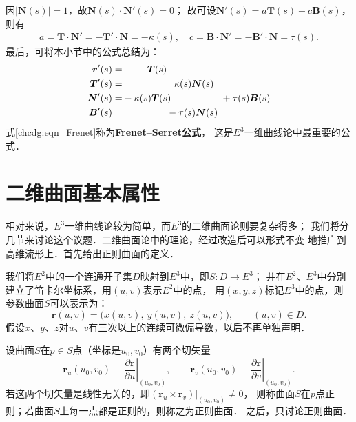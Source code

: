 因$|\boldsymbol{N}(s)|=1$，故$\boldsymbol{N}(s) \cdot \boldsymbol{N}'(s)=0$；
故可设$\boldsymbol{N}'(s)=a \boldsymbol{T}(s) + c \boldsymbol{B}(s)$，则有
\begin{align*}
    a = \boldsymbol{T} \cdot \boldsymbol{N}' = -\boldsymbol{T}' \cdot \boldsymbol{N} = - \kappa(s), \quad
    c = \boldsymbol{B} \cdot \boldsymbol{N}' = -\boldsymbol{B}' \cdot \boldsymbol{N} = \tau(s). 
\end{align*}
最后，可将本小节中的公式总结为：
\begin{subequations}\label{chcdg:eqn_Frenet}
    \begin{align}
        \boldsymbol{r}'(s) =& \hphantom{-\kappa(s)} \boldsymbol{T}(s) \label{chcdg:eqn_Freneta} \\
        \boldsymbol{T}'(s) =& \hphantom{-\kappa(s) \boldsymbol{T}(s) - }
           \kappa(s) \boldsymbol{N}(s) \label{chcdg:eqn_Frenetb}\\
        \boldsymbol{N}'(s) =& -\kappa(s) \boldsymbol{T}(s) \hphantom{-\kappa(s) \boldsymbol{N}(s), }
           +\tau(s) \boldsymbol{B}(s) \label{chcdg:eqn_Frenetc}\\
        \boldsymbol{B}'(s) =& \hphantom{-\kappa(s) \boldsymbol{T}(s)} 
         -\tau(s) \boldsymbol{N}(s)  \label{chcdg:eqn_Frenetd}
    \end{align}
\end{subequations}
式\eqref{chcdg:eqn_Frenet}称为{\bfseries \heiti Frenet--Serret公式}，
这是$E^3$一维曲线论中最重要的公式．

\section{二维曲面基本属性}


相对来说，$E^3$一维曲线论较为简单，而$E^3$的二维曲面论则要复杂得多；
我们将分几节来讨论这个议题．二维曲面论中的理论，经过改造后可以形式不变
地推广到高维流形上．首先给出正则曲面的定义．

我们将$E^2$中的一个连通开子集$D$映射到$E^3$中，即$S:D\to E^3$；
并在$E^2$、$E^3$中分别建立了笛卡尔坐标系，用$(u,v)$表示$E^2$中的点，
用$(x,y,z)$标记$E^3$中的点，则{\kaishu 参数曲面}$S$可以表示为：
\begin{equation}
    \boldsymbol{r}(u,v) = \bigl(x(u,v), \  y(u,v),\  z(u,v)\bigr),
    \qquad (u,v)\in D.
\end{equation}
假设$x$、$y$、$z$对$u$、$v$有三次以上的连续可微偏导数，以后不再单独声明．


设曲面$S$在$p\in S$点（坐标是$u_0,v_0$）有两个切矢量
\begin{equation}\label{chcdg:eqn_rurv}
    \boldsymbol{r}_u (u_0,v_0) \equiv \left. \frac{\partial \boldsymbol{r}}{\partial u} \right|_{(u_0,v_0)},\qquad
    \boldsymbol{r}_v (u_0,v_0) \equiv \left. \frac{\partial \boldsymbol{r}}{\partial v} \right|_{(u_0,v_0)}.
\end{equation}
若这两个切矢量是线性无关的，即$(\boldsymbol{r}_u\times   \boldsymbol{r}_v)|_{(u_0,v_0)} \neq 0$，
则称曲面$S$在$p$点{\heiti 正则}；若曲面$S$上每一点都是正则的，则称之为{\heiti 正则曲面}．
之后，只讨论正则曲面．


